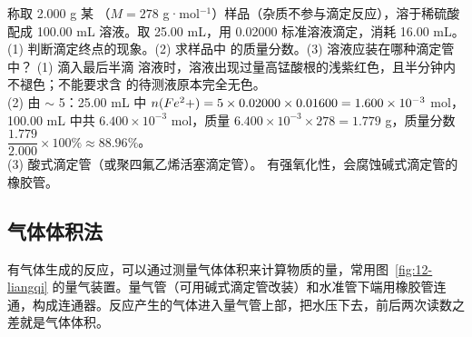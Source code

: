 \begin{liti}[典型·氧化还原滴定]
称取 2.000 g 某 （$M=278$ g·mol$^{-1}$）样品（杂质不参与滴定反应），溶于稀硫酸配成 100.00 mL 溶液。取 25.00 mL，用 0.02000\molL{}  标准溶液滴定，消耗 16.00 mL。(1) 判断滴定终点的现象。(2) 求样品中  的质量分数。(3)  溶液应装在哪种滴定管中？
\tcblower
\jie (1) 滴入最后半滴  溶液时，溶液出现过量高锰酸根的浅紫红色，且半分钟内不褪色；不能要求含  的待测液原本完全无色。\\
(2) 由  $\sim$ 5：25.00 mL 中 $n(Fe^2+)=5\times0.02000\times0.01600=1.600\times10^{-3}$ mol，100.00 mL 中共 $6.400\times10^{-3}$ mol，质量 $6.400\times10^{-3}\times278=1.779$ g，质量分数 $\dfrac{1.779}{2.000}\times100\%\approx88.96\%$。\\
(3) 酸式滴定管（或聚四氟乙烯活塞滴定管）。 有强氧化性，会腐蚀碱式滴定管的橡胶管。
\end{liti}

\subsection{气体体积法}

有气体生成的反应，可以通过测量气体体积来计算物质的量，常用图~\ref{fig:12-liangqi} 的量气装置。量气管（可用碱式滴定管改装）和水准管下端用橡胶管连通，构成连通器。反应产生的气体进入量气管上部，把水压下去，前后两次读数之差就是气体体积。

